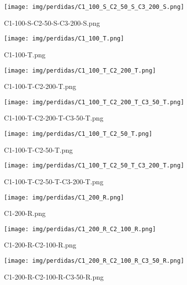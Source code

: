 \begin{figure}[H]
    \centerline{\texttt{[image: img/perdidas/C1\_100\_S\_C2\_50\_S\_C3\_200\_S.png]}}
    \caption{C1-100-S-C2-50-S-C3-200-S.png}
    \label{fig:C1_100_S_C2_50_S_C3_200_S.png}
\end{figure}

\begin{figure}[H]
    \centerline{\texttt{[image: img/perdidas/C1\_100\_T.png]}}
    \caption{C1-100-T.png}
    \label{fig:C1_100_T.png}
\end{figure}

\begin{figure}[H]
    \centerline{\texttt{[image: img/perdidas/C1\_100\_T\_C2\_200\_T.png]}}
    \caption{C1-100-T-C2-200-T.png}
    \label{fig:C1_100_T_C2_200_T.png}
\end{figure}

\begin{figure}[H]
    \centerline{\texttt{[image: img/perdidas/C1\_100\_T\_C2\_200\_T\_C3\_50\_T.png]}}
    \caption{C1-100-T-C2-200-T-C3-50-T.png}
    \label{fig:C1_100_T_C2_200_T_C3_50_T.png}
\end{figure}

\begin{figure}[H]
    \centerline{\texttt{[image: img/perdidas/C1\_100\_T\_C2\_50\_T.png]}}
    \caption{C1-100-T-C2-50-T.png}
    \label{fig:C1_100_T_C2_50_T.png}
\end{figure}

\begin{figure}[H]
    \centerline{\texttt{[image: img/perdidas/C1\_100\_T\_C2\_50\_T\_C3\_200\_T.png]}}
    \caption{C1-100-T-C2-50-T-C3-200-T.png}
    \label{fig:C1_100_T_C2_50_T_C3_200_T.png}
\end{figure}

\begin{figure}[H]
    \centerline{\texttt{[image: img/perdidas/C1\_200\_R.png]}}
    \caption{C1-200-R.png}
    \label{fig:C1_200_R.png}
\end{figure}

\begin{figure}[H]
    \centerline{\texttt{[image: img/perdidas/C1\_200\_R\_C2\_100\_R.png]}}
    \caption{C1-200-R-C2-100-R.png}
    \label{fig:C1_200_R_C2_100_R.png}
\end{figure}

\begin{figure}[H]
    \centerline{\texttt{[image: img/perdidas/C1\_200\_R\_C2\_100\_R\_C3\_50\_R.png]}}
    \caption{C1-200-R-C2-100-R-C3-50-R.png}
    \label{fig:C1_200_R_C2_100_R_C3_50_R.png}
\end{figure}

